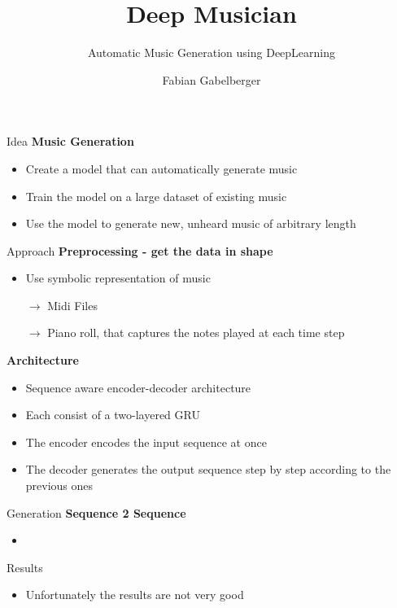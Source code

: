 \documentclass[xcolor={dvipsnames},12pt]{beamer}
\title{Deep Musician}
\subtitle{Automatic Music Generation using DeepLearning}
\author{Fabian Gabelberger}
\begin{document}
\maketitle

\begin{frame}{Idea}
    \textbf{Music Generation}
    \begin{itemize}
        \setlength\itemsep{1em}
        \item Create a model that can automatically generate music
        \item Train the model on a large dataset of existing music
        \item Use the model to generate new, unheard music of arbitrary length
    \end{itemize}
\end{frame}

\begin{frame}{Approach}
    \textbf{Preprocessing - get the data in shape}
    \begin{itemize}
        \item Use symbolic representation of music
        \item[$\rightarrow$] Midi Files
        \item[$\rightarrow$] Piano roll, that captures the
            notes played at each time step
    \end{itemize}

    \textbf{Architecture}
    \begin{itemize}
        \item Sequence aware encoder-decoder architecture
        \item Each consist of a two-layered GRU
        \item The encoder encodes the input sequence at once
        \item The decoder generates the output sequence step by step according
              to the previous ones
    \end{itemize}
\end{frame}

\begin{frame}{Generation}
    \textbf{Sequence 2 Sequence}
    \begin{itemize}
        \item 
    \end{itemize}
\end{frame}

\begin{frame}{Results}
    \begin{itemize}
        \item Unfortunately the results are not very good
    \end{itemize}
\end{frame}
\end{document}
